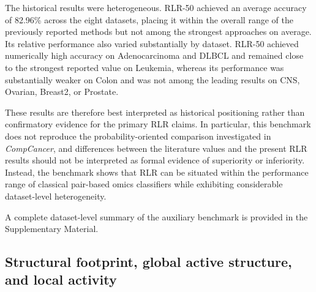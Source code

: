 \documentclass[journal]{IEEEtran}
\begin{document}
The historical results were heterogeneous. RLR-50 achieved an average accuracy of 82.96\% across the eight datasets, placing it within the overall range of the previously reported methods but not among the strongest approaches on average. Its relative performance also varied substantially by dataset. RLR-50 achieved numerically high accuracy on Adenocarcinoma and DLBCL and remained close to the strongest reported value on Leukemia, whereas its performance was substantially weaker on Colon and was not among the leading results on CNS, Ovarian, Breast2, or Prostate.

These results are therefore best interpreted as historical positioning rather than confirmatory evidence for the primary RLR claims. In particular, this benchmark does not reproduce the probability-oriented comparison investigated in \emph{CompCancer}, and differences between the literature values and the present RLR results should not be interpreted as formal evidence of superiority or inferiority. Instead, the benchmark shows that RLR can be situated within the performance range of classical pair-based omics classifiers while exhibiting considerable dataset-level heterogeneity.

A complete dataset-level summary of the auxiliary benchmark is provided in the Supplementary Material.

\subsection{Structural footprint, global active structure, and local activity}
\end{document}
